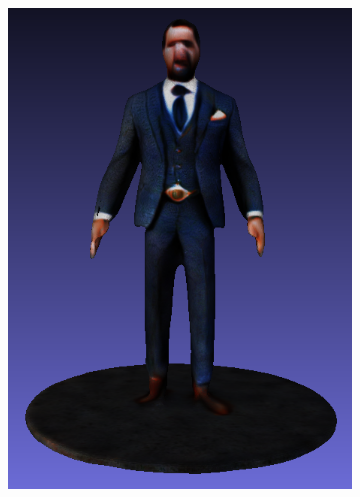 \begin{figure}[ht]
    \begin{subfigure}[b]{0.218\textwidth}
        \centering
        \includegraphics[width=\textwidth]{figures/appendix/bias_rich_genie_1.png}
        \caption{}
    \end{subfigure}
    \begin{subfigure}[b]{0.15\textwidth}
        \centering

\end{subfigure}
\end{figure}

